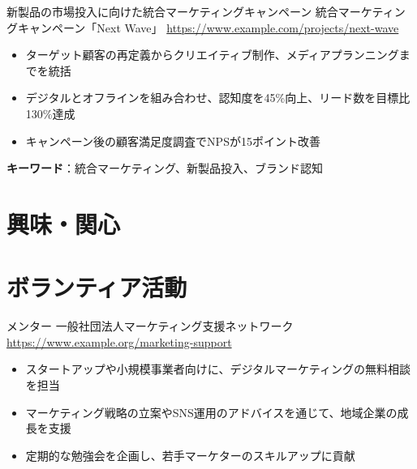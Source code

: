 \documentclass[a4paper, serif, 10pt]{moderncv}
\begin{document}
        {新製品の市場投入に向けた統合マーケティングキャンペーン}
        {統合マーケティングキャンペーン「Next Wave」}
        {\url{https://www.example.com/projects/next-wave}}
        {}
        {\begin{itemize}
\item ターゲット顧客の再定義からクリエイティブ制作、メディアプランニングまでを統括
\item デジタルとオフラインを組み合わせ、認知度を45\%向上、リード数を目標比130\%達成
\item キャンペーン後の顧客満足度調査でNPSが15ポイント改善
\end{itemize}
\textbf{キーワード}：統合マーケティング、新製品投入、ブランド認知}
\section{興味・関心}

\section{ボランティア活動}

        {メンター}
        {一般社団法人マーケティング支援ネットワーク}
        {\url{https://www.example.org/marketing-support}}
        {}
        {\begin{itemize}
\item スタートアップや小規模事業者向けに、デジタルマーケティングの無料相談を担当
\item マーケティング戦略の立案やSNS運用のアドバイスを通じて、地域企業の成長を支援
\item 定期的な勉強会を企画し、若手マーケターのスキルアップに貢献
\end{itemize}}
    
\end{document}
